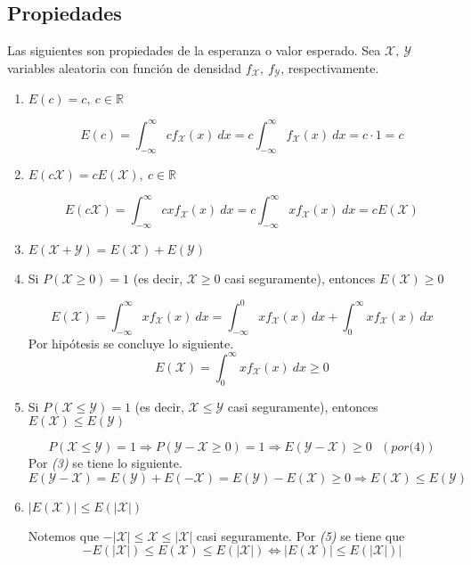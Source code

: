 \subsection{Propiedades}
Las siguientes son propiedades de la esperanza o valor esperado. Sea $\mathcal X,~ \mathcal Y$ variables aleatoria con función de densidad $f_{\mathcal X},~ f_{\mathcal Y}$, respectivamente.
\begin{enumerate}
  \item $E(c) = c,~ c \in \mathbb R$
    \begin{myproof}
      \[E(c) = \int_{-\infty}^{\infty} c f_{\mathcal X}(x)~dx = c \int_{-\infty}^{\infty} f_{\mathcal X}(x)~dx = c \cdot 1 = c\]
    \end{myproof}
  \item $E(c \mathcal X) = c E(\mathcal X),~ c \in \mathbb R$
    \begin{myproof}
      \[E(c\mathcal X) = \int_{-\infty}^{\infty} cx f_{\mathcal X}(x)~dx = c \int_{-\infty}^{\infty} xf_{\mathcal X}(x)~dx = c E(\mathcal X)\]
    \end{myproof}
  \item $E(\mathcal X + \mathcal Y) = E(\mathcal X) + E(\mathcal Y)$
  \item Si $P(\mathcal X \ge 0) = 1$ (es decir, $\mathcal X \ge 0$ casi seguramente), entonces $E(\mathcal X) \ge 0$
    \begin{myproof}
      \[E(\mathcal X) = \int_{-\infty}^{\infty} x f_{\mathcal X}(x)~dx = \int_{-\infty}^{0} xf_{\mathcal X}(x)~dx + \int_{0}^{\infty} xf_{\mathcal X}(x)~dx\]
      Por hipótesis se concluye lo siguiente.
      \[E(\mathcal X) = \int_{0}^{\infty} xf_{\mathcal X}(x)~dx \ge 0\]
    \end{myproof}
  \item Si $P(\mathcal X \le \mathcal Y) = 1$ (es decir, $\mathcal X \le \mathcal Y$ casi seguramente), entonces $E(\mathcal X) \le E(\mathcal Y)$
    \begin{myproof}
      \[P(\mathcal X \le \mathcal Y) = 1 \Longrightarrow P(\mathcal Y - \mathcal X \ge 0) = 1 \Longrightarrow E(\mathcal Y - \mathcal X) \ge 0 ~~~(por \textit{(4)})\]
      Por \textit{(3)} se tiene lo siguiente.
      \[E(\mathcal Y - \mathcal X) = E(\mathcal Y) + E(\mathcal {-X}) = E(\mathcal Y) - E(\mathcal X) \ge 0 \Longrightarrow E(\mathcal X) \le E(\mathcal Y) \]
    \end{myproof}
  \item $|E(\mathcal X)| \le E(|\mathcal X|)$
    \begin{myproof}
      Notemos que $- |\mathcal X| \le \mathcal X \le |\mathcal X|$ casi seguramente.
      Por \textit{(5)} se tiene que
      \[-E(|\mathcal X|) \le E(\mathcal X) \le E(|\mathcal X|)
        \Longleftrightarrow
      |E(\mathcal X)| \le E(|\mathcal X|)|\]
    \end{myproof}
\end{enumerate}

